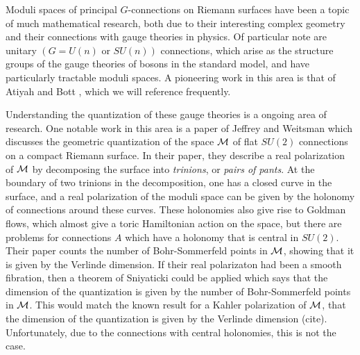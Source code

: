 

	Moduli spaces of principal $G$-connections on Riemann surfaces have been a topic of much mathematical research, both due to their interesting complex geometry and their connections with gauge theories in physics. Of particular note are unitary $(G=U(n) \text{ or }SU(n))$ connections, which arise as the structure groups of the gauge theories of bosons in the standard model, and have particularly tractable moduli spaces. A pioneering work in this area is that of Atiyah and Bott \cite{atiyah_yang-mills_1983}, which we will reference frequently. 
	
	Understanding the quantization of these gauge theories is a ongoing area of research. One notable work in this area is a paper of Jeffrey and Weitsman \cite{jeffrey_bohr-sommerfeld_1992} which discusses the geometric quantization of the space $\mathcal{M}$ of flat $SU(2)$ connections on a compact Riemann surface. In their paper, they describe a real polarization of $\mathcal{M}$ by decomposing the surface into \textit{trinions}, or \textit{pairs of pants}. At the boundary of two trinions in the decomposition, one has a closed curve in the surface, and a real polarization of the moduli space can be given by the holonomy of connections around these curves. These holonomies also give rise to Goldman flows, which almost give a toric Hamiltonian action on the space, but there are problems for connections $A$ which have a holonomy that is central in $SU(2)$. Their paper counts the number of Bohr-Sommerfeld points in $\mathcal{M}$, showing that it is given by the Verlinde dimension. If their real polarizaton had been a smooth fibration, then a theorem of Sniyaticki could be applied which says that the dimension of the quantization is given by the number of Bohr-Sommerfeld points in $\mathcal{M}$. This would match the known result for a Kahler polarization of $\mathcal{M}$, that the dimension of the quantization is given by the Verlinde dimension (cite). Unfortunately, due to the connections with central holonomies, this is not the case.
	
